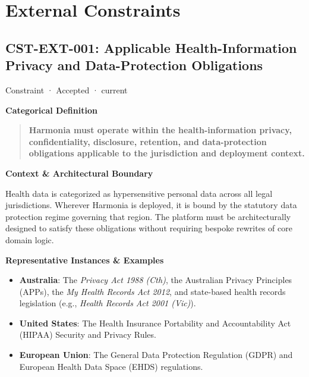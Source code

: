 \chapter{External Constraints}

\section{CST-EXT-001: Applicable Health-Information Privacy and Data-Protection Obligations}

\label{element:0ed6fb9fcc9547659ce76b917881274e}
{\small Constraint · Accepted · current}\par

\par\medskip\textbf{Categorical Definition}\par


\begin{quote}


\textbf{Harmonia must operate within the health-information privacy, confidentiality, disclosure, retention, and data-protection obligations applicable to the jurisdiction and deployment context.}



\end{quote}


\par\medskip\textbf{Context \& Architectural Boundary}\par


Health data is categorized as hypersensitive personal data across all legal jurisdictions. Wherever Harmonia is deployed, it is bound by the statutory data protection regime governing that region. The platform must be architecturally designed to satisfy these obligations without requiring bespoke rewrites of core domain logic.



\par\medskip\textbf{Representative Instances \& Examples}\par


\begin{itemize}


\item \textbf{Australia}: The \emph{Privacy Act 1988 (Cth)}, the Australian Privacy Principles (APPs), the \emph{My Health Records Act 2012}, and state-based health records legislation (e.g., \emph{Health Records Act 2001 (Vic)}).

\item \textbf{United States}: The Health Insurance Portability and Accountability Act (HIPAA) Security and Privacy Rules.

\item \textbf{European Union}: The General Data Protection Regulation (GDPR) and European Health Data Space (EHDS) regulations.

\end{itemize}


